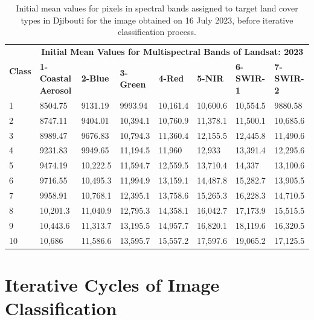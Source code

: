 \documentclass[jimaging,article,accept,pdftex,moreauthors]{Definitions/mdpi}
\begin{document}
\vspace{-6pt}
\begin{table}[H]\footnotesize
  \caption{Initial mean values for pixels in spectral bands assigned to target land cover types in Djibouti for the image obtained on 16 July 2023, before iterative classification process.}
  \centering
  \begin{tabularx}{\textwidth}{p{0.7cm}p{2.5cm}p{1.0cm}p{1.3cm}p{1.0cm}p{1.0cm}p{1.5cm}p{1.5cm}}
  \toprule
  \multirow{2}{*}{\textbf{Class}} & \multicolumn{7}{c}{\textbf{Initial Mean Values for Multispectral Bands of Landsat: 2023}} \\
     & \textbf{1-Coastal Aerosol} & \textbf{2-Blue} & \textbf{3-Green} & \textbf{4-Red} & \textbf{5-NIR} & \textbf{6-SWIR-1} & \textbf{7-SWIR-2} \\
    \midrule
    1 & 8504.75 & 9131.19 & 9993.94 & 10,161.4 & 10,600.6 & 10,554.5 & 9880.58 \\
    2 & 8747.11 & 9404.01 & 10,394.1 & 10,760.9 & 11,378.1 & 11,500.1 & 10,685.6 \\
    3 & 8989.47 & 9676.83 & 10,794.3 & 11,360.4 & 12,155.5 & 12,445.8 & 11,490.6 \\
    4 & 9231.83 & 9949.65 & 11,194.5 & 11,960 & 12,933 & 13,391.4 & 12,295.6 \\
    5 & 9474.19 & 10,222.5 & 11,594.7 & 12,559.5 & 13,710.4 & 14,337 & 13,100.6 \\
    6 & 9716.55 & 10,495.3 & 11,994.9 & 13,159.1 & 14,487.8 & 15,282.7 & 13,905.5 \\
    7 & 9958.91 & 10,768.1 & 12,395.1 & 13,758.6 & 15,265.3 & 16,228.3 & 14,710.5 \\
    8 & 10,201.3 & 11,040.9 & 12,795.3 & 14,358.1 & 16,042.7 &17,173.9 & 15,515.5 \\
    9 & 10,443.6 & 11,313.7 & 13,195.5 & 14,957.7 & 16,820.1 & 18,119.6 & 16,320.5 \\
    10 & 10,686 & 11,586.6 & 13,595.7 & 15,557.2 & 17,597.6 & 19,065.2 & 17,125.5 \\
\bottomrule
\end{tabularx}

  \label{tabA4} 
\end{table}

\section[\appendixname~\thesection]{Iterative Cycles of Image Classification}\label{AppB}
\end{document}
